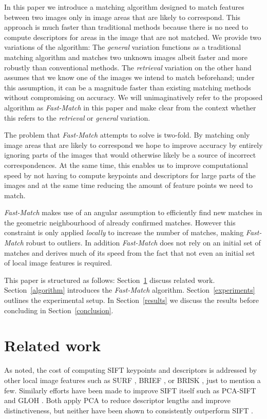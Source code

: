 \documentclass[runningheads]{llncs}
\begin{document}
In this paper we introduce a matching algorithm designed to match features between two images only in image areas that are likely to correspond. This approach is much faster than traditional methods because there is no need to compute descriptors for areas in the image that are not matched. We provide two variations of the algorithm: The \emph{general} variation functions as a traditional matching algorithm and matches two unknown images albeit faster and more robustly than conventional methods. The \emph{retrieval} variation on the other hand assumes that we know one of the images we intend to match beforehand; under this assumption, it can be a magnitude faster than existing matching methods without compromising on accuracy. We will unimaginatively refer to the proposed algorithm as \emph{Fast-Match} in this paper and make clear from the context whether this refers to the \emph{retrieval} or \emph{general} variation.

The problem that \emph{Fast-Match} attempts to solve is two-fold. By matching only image areas that are likely to correspond we hope to improve accuracy by entirely ignoring parts of the images that would otherwise likely be a source of incorrect correspondences. At the same time, this enables us to improve computational speed by not having to compute keypoints and descriptors for large parts of the images and at the same time reducing the amount of feature points we need to match. 

\emph{Fast-Match} makes use of an angular assumption to efficiently find new matches in the geometric neighbourhood of already confirmed matches. However this constraint is only applied \emph{locally} to increase the number of matches, making \emph{Fast-Match} robust to outliers. In addition \emph{Fast-Match} does not rely on an initial set of matches and derives much of its speed from the fact that not even an initial set of local image features is required.

This paper is structured as follows: Section~\ref{related} discuss related work. Section~\ref{algorithm} introduces the \emph{Fast-Match} algorithm. Section~\ref{experiments} outlines the experimental setup. In Section~\ref{results} we discuss the results before concluding in Section~\ref{conclusion}.

\section{Related work}
\label{related}
%
As noted, the cost of computing SIFT keypoints and descriptors is addressed by other local image features such as SURF \cite{bay2006surf}, BRIEF \cite{calonder2010brief}, or BRISK \cite{leutenegger2011brisk}, just to mention a few. Similarly efforts have been made to improve SIFT itself such as PCA-SIFT \cite{ke2004pca} and GLOH \cite{mikolajczyk2005performance}. Both apply PCA to reduce descriptor lengths and improve distinctiveness, but neither have been shown to consistently outperform SIFT 
\cite{mikolajczyk2005performance,li2008comprehensive}. 
\end{document}
